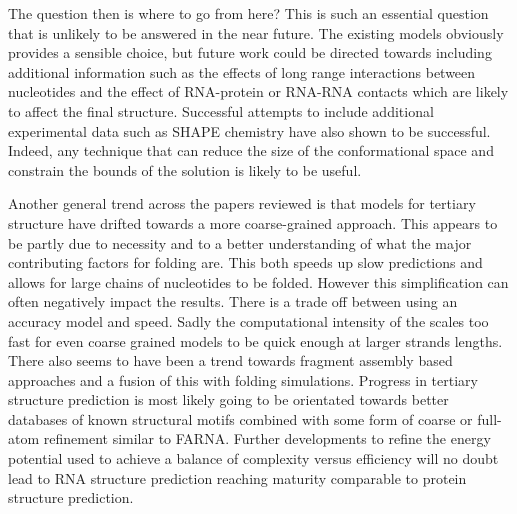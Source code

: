 \documentclass[journal]{IEEEtran}
\begin{document}
The question then is where to go from here? This is such an essential question that is unlikely to be answered in the near future. The existing models obviously provides a sensible choice, but future work could be directed towards including additional information such as the effects of long range interactions between nucleotides and the effect of RNA-protein or RNA-RNA contacts which are likely to affect the final structure. Successful attempts to include additional experimental data such as SHAPE chemistry have also shown to be successful. Indeed, any technique that can reduce the size of the conformational space and constrain the bounds of the solution is likely to be useful.

Another general trend across the papers reviewed is that models for tertiary structure have drifted towards a more coarse-grained approach. This appears to be partly due to necessity and to a better understanding of what the major contributing factors for folding are. This both speeds up slow predictions and allows for large chains of nucleotides to be folded. However this simplification can often negatively impact the results. There is a trade off between using an accuracy model and speed. Sadly the computational intensity of the scales too fast for even coarse grained models to be quick enough at larger strands lengths. There also seems to have been a trend towards fragment assembly based approaches and a fusion of this with folding simulations. Progress in tertiary structure prediction is most likely going to be orientated towards better databases of known structural motifs combined with some form of coarse or full-atom refinement similar to FARNA. Further developments to refine  the energy potential used to achieve a balance of complexity versus efficiency will no doubt lead to RNA structure prediction reaching maturity comparable to protein structure prediction.



%
\end{document}
